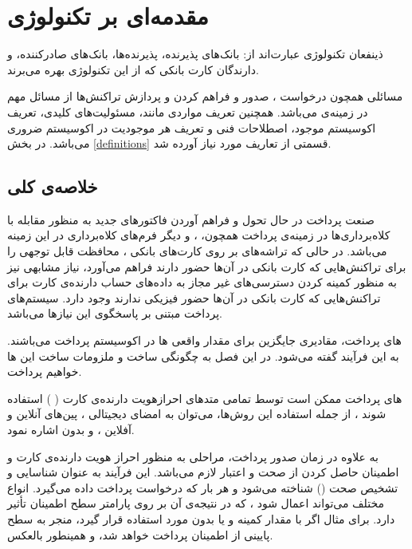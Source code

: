 \documentclass[oneside]{report}
\begin{document}
\section{ مقدمه‌ای بر تکنولوژی     {\large  {}} }					
ذینفعان تکنولوژی 
{\normalsize  {}}			
عبارت‌اند از:‌ بانک‌های پذیرنده،  پذیرنده‌ها، بانک‌های صادرکننده،  و دارندگان کارت بانکی که از این تکنولوژی بهره می‌برند. 

مسائلی همچون درخواست
{\normalsize  {}}،   صدور و فراهم کردن
{\normalsize  {}}
و پردازش تراکنش‌ها از مسائل مهم در زمینه‌ی 
{\normalsize  {}}
می‌باشد. همچنین تعریف مواردی مانند،  مسئولیت‌های کلیدی،   تعریف اکوسیستم موجود، اصطلاحات فنی و تعریف هر موجودیت در اکوسیستم ضروری می‌باشد.  در بخش 
\ref{definitions}
قسمتی از تعاریف مورد نیاز آورده شد. 

\subsection{خلاصه‌ی کلی}
صنعت پرداخت در حال تحول و فراهم آوردن فاکتورهای جدید به منظور مقابله با کلاه‌برداری‌ها در زمینه‌ی پرداخت همچون،
					{\normalsize {}} ، 
							{\normalsize {}}
	و دیگر فرم‌های کلاه‌برداری در این زمینه می‌باشد.  در حالی که تراشه‌های 
						{\normalsize {}}
بر روی کارت‌های بانکی ، محافظت قابل توجهی را برای تراکنش‌هایی که کارت بانکی در آن‌ها حضور دارند فراهم می‌آورد، نیاز مشابهی نیز به منظور کمینه کردن دسترسی‌های غیر مجاز به داده‌های حساب دارنده‌ی کارت برای تراکنش‌هایی که کارت بانکی در آن‌ها حضور فیزیکی ندارند وجود دارد.  سیستم‌های پرداخت مبتنی بر
					{\normalsize {}}
پاسخگوی این نیازها می‌باشد.

{\normalsize  {}} های 
پرداخت،  مقادیری جایگزین برای مقدار واقعی 
{\normalsize  {}}ها 
در اکوسیستم پرداخت می‌باشند. به این فرآیند 
{\normalsize {}}
 گفته می‌شود. در این فصل به چگونگی ساخت و ملزومات ساخت این 
{\normalsize  {}}ها
خواهیم پرداخت. 

{\normalsize  {}}های پرداخت
ممکن است توسط تمامی متدهای احرازهویت دارنده‌ی کارت 
(
{\normalsize  {}}
)
استفاده شوند ، از جمله استفاده این روش‌ها، می‌توان به امضای دیجیتالی ، پین‌های آنلاین و آفلاین ، و بدون
{\normalsize  {}}
اشاره نمود.
														
 به علاوه در زمان صدور 
 {\normalsize  {}}
 پرداخت، مراحلی به منظور احراز هویت دارنده‌ی کارت و اطمینان حاصل کردن از صحت و اعتبار 
 {\normalsize  {}}
 لازم می‌باشد.
 این فرآیند به عنوان  شناسایی و تشخیص صحت 
({\normalsize  {}})
شناخته می‌شود و هر بار که درخواست 
{\normalsize  {}}
پرداخت داده می‌گیرد. انواع مختلف 
{\normalsize  {}}
می‌تواند اعمال شود ، که در نتیجه‌ی آن بر روی پارامتر سطح اطمینان 
{\normalsize  {}}
تأثیر دارد. برای مثال اگر با مقدار کمینه و یا بدون 
{\normalsize  {}}
مورد استفاده قرار گیرد، منجر به سطح پایینی از اطمینان 
{\normalsize  {}}
پرداخت خواهد شد،  و همینطور بالعکس. 
\end{document}
